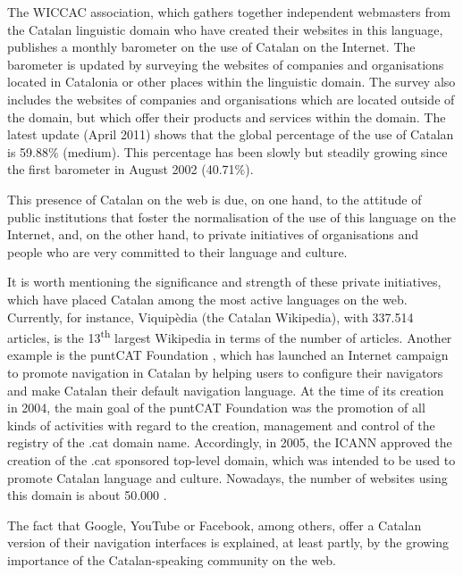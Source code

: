 \begin{multicols}{2}
The WICCAC \cite{CAT-Nota18} association, which gathers together independent webmasters from the Catalan linguistic domain who have created their websites in this language, publishes a monthly barometer on the use of Catalan on the Internet. The barometer is updated by surveying the websites of companies and organisations located in Catalonia or other places within the linguistic domain. The survey also includes the websites of companies and organisations which are located outside of the domain, but which offer their products and services within the domain. The latest update (April 2011) shows that the global percentage of the use of Catalan is 59.88\% (medium). This percentage has been slowly but steadily growing since the first barometer in August 2002 (40.71\%).

This presence of Catalan on the web is due, on one hand, to the attitude of public institutions that foster the normalisation of the use of this language on the Internet, and, on the other hand, to private initiatives of organisations and people who are very committed to their language and culture.

It is worth mentioning the significance and strength of these private initiatives, which have placed Catalan among the most active languages on the web. Currently, for instance, Viquipèdia (the Catalan Wikipedia), with 337.514 articles, is the 13\textsuperscript{th} largest Wikipedia in terms of the number of articles. Another example is the puntCAT Foundation \cite{CAT-Nota19}, which has launched an Internet campaign to promote navigation in Catalan by helping users to configure their navigators and make Catalan their default navigation language. At the time of its creation in 2004, the main goal of the puntCAT Foundation was the promotion of all kinds of activities with regard to the creation, management and control of the registry of the .cat domain name. Accordingly, in 2005, the ICANN approved the creation of the .cat sponsored top-level domain, which was intended to be used to promote Catalan language and culture. Nowadays, the number of websites using this domain is about 50.000 \cite{CAT-Nota20}.

The fact that Google, YouTube or Facebook, among others, offer a Catalan version of their navigation interfaces is explained, at least partly, by the growing importance of the Catalan-speaking community on the web.


\end{multicols}

